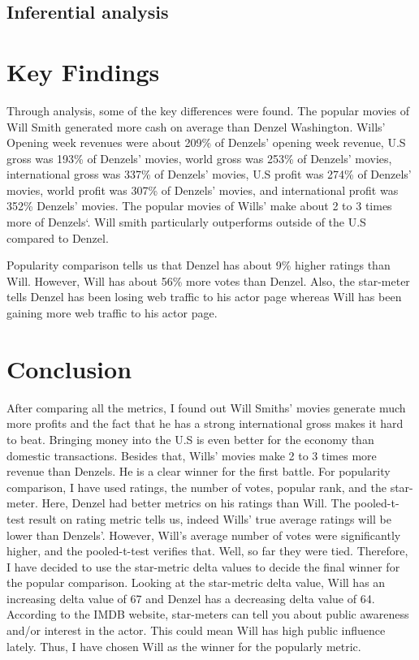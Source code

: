\documentclass[]{article}
\begin{document}
\newpage

\subsection{Inferential analysis}
\label{sec:inference}



\section{Key Findings}
\label{sec:findings}

\noindent Through analysis, some of the key differences were found. The
popular movies of Will Smith generated more cash on average than Denzel
Washington. Wills' Opening week revenues were about 209\% of Denzels'
opening week revenue, U.S gross was 193\% of Denzels' movies, world
gross was 253\% of Denzels' movies, international gross was 337\% of
Denzels' movies, U.S profit was 274\% of Denzels' movies, world profit
was 307\% of Denzels' movies, and international profit was 352\%
Denzels' movies. The popular movies of Wills' make about 2 to 3 times
more of Denzels`. Will smith particularly outperforms outside of the U.S
compared to Denzel.\vspace{0.25in}

\noindent Popularity comparison tells us that Denzel has about 9\%
higher ratings than Will. However, Will has about 56\% more votes than
Denzel. Also, the star-meter tells Denzel has been losing web traffic to
his actor page whereas Will has been gaining more web traffic to his
actor page.\vspace{0.25in}

\section{Conclusion}
\label{sec:conclusion}

\noindent After comparing all the metrics, I found out Will Smiths'
movies generate much more profits and the fact that he has a strong
international gross makes it hard to beat. Bringing money into the U.S
is even better for the economy than domestic transactions. Besides that,
Wills' movies make 2 to 3 times more revenue than Denzels. He is a clear
winner for the first battle. For popularity comparison, I have used
ratings, the number of votes, popular rank, and the star-meter. Here,
Denzel had better metrics on his ratings than Will. The pooled-t-test
result on rating metric tells us, indeed Wills' true average ratings
will be lower than Denzels'. However, Will's average number of votes
were significantly higher, and the pooled-t-test verifies that. Well, so
far they were tied. Therefore, I have decided to use the star-metric
delta values to decide the final winner for the popular comparison.
Looking at the star-metric delta value, Will has an increasing delta
value of 67 and Denzel has a decreasing delta value of 64. According to
the IMDB website, star-meters can tell you about public awareness and/or
interest in the actor. This could mean Will has high public influence
lately. Thus, I have chosen Will as the winner for the popularly
metric.\vspace{0.25in}
\end{document}
